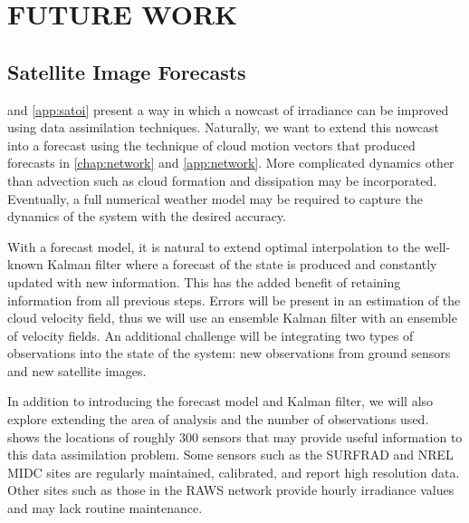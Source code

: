 \chapter{FUTURE WORK}
\label{chap:satfx}
\label{chap:future_work}


\section{Satellite Image Forecasts}
\label{sec:satellite_fx}

 and \cref{app:satoi} present a way in which a
nowcast of irradiance can be improved using data assimilation
techniques.
Naturally, we want to extend this nowcast into a forecast using the
technique of cloud motion vectors that produced forecasts in
\cref{chap:network} and \cref{app:network}.
More complicated dynamics other than advection such as cloud formation
and dissipation may be incorporated.
Eventually, a full numerical weather model may be required to capture
the dynamics of the system with the desired accuracy.


With a forecast model, it is natural to extend optimal interpolation
to the well-known Kalman filter where a forecast of the state is
produced and constantly updated with new information.
This has the added benefit of retaining information from all previous
steps.
Errors will be present in an estimation of the cloud velocity field,
thus we will use an ensemble Kalman filter with an ensemble of
velocity fields.
An additional challenge will be integrating two types of observations
into the state of the system: new observations from ground sensors and
new satellite images.


In addition to introducing the forecast model and Kalman filter, we
will also explore extending the area of analysis and the number of
observations used.
 shows the locations of roughly 300 sensors that
may provide useful information to this data assimilation problem.
Some sensors such as the SURFRAD and NREL MIDC sites are regularly
maintained, calibrated, and report high resolution data.
Other sites such as those in the RAWS network provide hourly
irradiance values and may lack routine maintenance.

